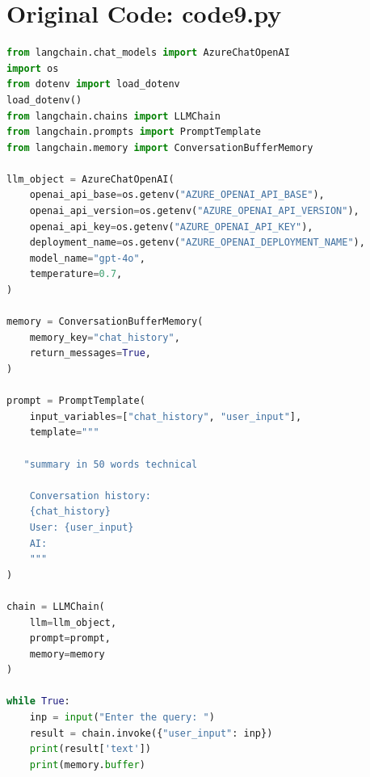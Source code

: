 \documentclass[11pt, a4paper]{article}
\begin{document}
\section{Original Code: code9.py}
\begin{lstlisting}[language=Python]
from langchain.chat_models import AzureChatOpenAI
import os
from dotenv import load_dotenv
load_dotenv()
from langchain.chains import LLMChain
from langchain.prompts import PromptTemplate
from langchain.memory import ConversationBufferMemory

llm_object = AzureChatOpenAI(
    openai_api_base=os.getenv("AZURE_OPENAI_API_BASE"),
    openai_api_version=os.getenv("AZURE_OPENAI_API_VERSION"),
    openai_api_key=os.getenv("AZURE_OPENAI_API_KEY"),
    deployment_name=os.getenv("AZURE_OPENAI_DEPLOYMENT_NAME"),
    model_name="gpt-4o",
    temperature=0.7,
)

memory = ConversationBufferMemory(
    memory_key="chat_history",
    return_messages=True,
)

prompt = PromptTemplate(
    input_variables=["chat_history", "user_input"],
    template="""

   "summary in 50 words technical

    Conversation history:
    {chat_history}
    User: {user_input}
    AI:
    """
)

chain = LLMChain(
    llm=llm_object,
    prompt=prompt,
    memory=memory
)

while True:
    inp = input("Enter the query: ")
    result = chain.invoke({"user_input": inp})
    print(result['text'])
    print(memory.buffer)
\end{lstlisting}
\end{document}

